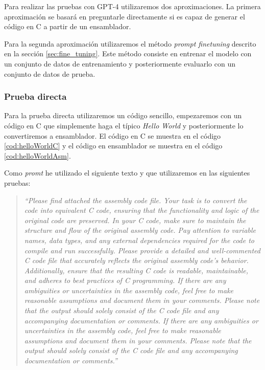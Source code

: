 
Para realizar las pruebas con GPT-4 utilizaremos dos aproximaciones. La primera aproximación
se basará en preguntarle directamente si es capaz de generar el código en C a partir de un
ensamblador.

Para la segunda aproximación utilizaremos el método \textit{prompt finetuning} descrito en
la sección \ref{sec:fine_tuning}. Este método consiste en entrenar el modelo con un conjunto
de datos de entrenamiento y posteriormente evaluarlo con un conjunto de datos de prueba.

\subsubsection{Prueba directa}
\label{subsubsec:prueba_directa}


Para la prueba directa utilizaremos un código sencillo, empezaremos con un código en C
que simplemente haga el típico \textit{Hello World} y posteriormente lo convertiremos a
ensamblador. El código en C se muestra en el código \ref{cod:helloWorldC} y el código
en ensamblador se muestra en el código \ref{cod:helloWorldAsm}.

Como \textit{promt} he utilizado el siguiente texto y que utilizaremos en las siguientes
pruebas:

\begin{quote}
    \textit{``Please find attached the assembly code file. Your task is to convert the code 
    into equivalent C code, ensuring that the functionality and logic of the original code 
    are preserved.\newline
    In your C code, make sure to maintain the structure and flow of the original assembly code.
    Pay attention to variable names, data types, and any external dependencies required for
    the code to compile and run successfully.\newline
    Please provide a detailed and well-commented C code file that accurately reflects the original
    assembly code's behavior. Additionally, ensure that the resulting C code is readable, maintainable,
    and adheres to best practices of C programming.\newline
    If there are any ambiguities or uncertainties in the assembly code, feel free to make reasonable
    assumptions and document them in your comments.\newline
    Please note that the output should solely consist of the C code file and any accompanying documentation
    or comments.\newline
    If there are any ambiguities or uncertainties in the assembly code, feel free to make reasonable assumptions
    and document them in your comments.\newline
    Please note that the output should solely consist of the C code file and any accompanying
    documentation or comments.''}
\end{quote}

